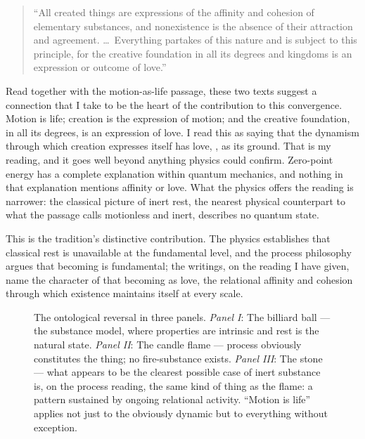 \begin{quote}
``All created things are expressions of the affinity and cohesion of elementary substances, and nonexistence is the absence of their attraction and agreement. \ldots\ Everything partakes of this nature and is subject to this principle, for the creative foundation in all its degrees and kingdoms is an expression or outcome of love.'' \citep[Talk 48]{PUP}
\end{quote}

Read together with the motion-as-life passage, these two texts suggest a connection that I take to be the heart of the \bahai contribution to this convergence. Motion is life; creation is the expression of motion; and the creative foundation, in all its degrees, is an expression of love. I read this as saying that the dynamism through which creation expresses itself has love, \mahabbat, as its ground. That is my reading, and it goes well beyond anything physics could confirm. Zero-point energy has a complete explanation within quantum mechanics, and nothing in that explanation mentions affinity or love. What the physics offers the reading is narrower: the classical picture of inert rest, the nearest physical counterpart to what the passage calls motionless and inert, describes no quantum state.

This is the \bahai tradition's distinctive contribution. The physics establishes that classical rest is unavailable at the fundamental level, and the process philosophy argues that becoming is fundamental; the \bahai writings, on the reading I have given, name the character of that becoming as love, the relational affinity and cohesion through which existence maintains itself at every scale.

\begin{figure}[htbp]
  \centering
  \resizebox{\linewidth}{!}{}
  \caption[From substance to process: the ontological reversal in three panels]{The ontological reversal in three panels. \emph{Panel I}: The billiard ball — the substance model, where properties are intrinsic and rest is the natural state. \emph{Panel II}: The candle flame — process obviously constitutes the thing; no fire-substance exists. \emph{Panel III}: The stone --- what appears to be the clearest possible case of inert substance is, on the process reading, the same kind of thing as the flame: a pattern sustained by ongoing relational activity. ``Motion is life'' applies not just to the obviously dynamic but to everything without exception.}
  \label{fig:triptych}
\end{figure}

